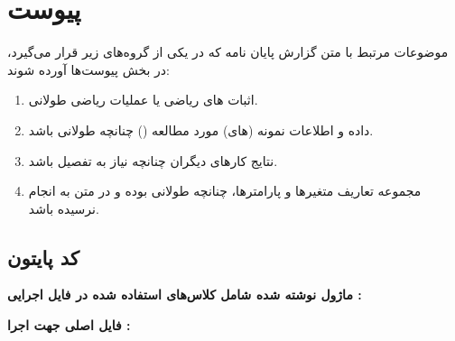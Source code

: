 \chapter*{‌پیوست}
موضوعات مرتبط با متن گزارش پایان نامه كه در يكی از گروه‌های زير قرار می‌گيرد، در بخش پيوست‌ها آورده شوند:
\begin{enumerate}
\item  اثبات های رياضی يا عمليات رياضی طولانی‌.‌
\item داده و اطلاعات نمونه (های) مورد مطالعه () چنانچه طولانی باشد‌.‌
\item نتايج كارهای ديگران چنانچه نياز به تفصيل باشد‌.‌
\item مجموعه تعاريف متغيرها و پارامترها، چنانچه طولانی بوده و در متن به انجام نرسيده باشد‌.‌
\end{enumerate}
\section*{کد پایتون }
\textbf{ماژول نوشته شده شامل کلاس‌های استفاده شده در فایل اجرایی :}
\begin{latin}
	
\end{latin}

\textbf{فایل اصلی جهت اجرا :}

\begin{latin}
	
\end{latin}


